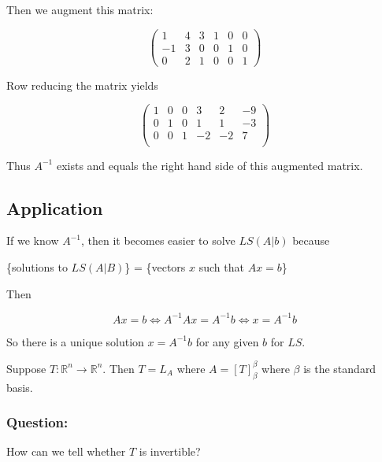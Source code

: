 \documentclass{article}
\newtheorem{one minute paper}[theorem]{One Minute Paper}
\begin{document}
Then we augment this matrix:

\begin{equation}
    \left(\begin{array}{ccc|ccc}
        1 & 4 & 3 & 1 & 0 & 0 \\
        -1 & 3 & 0 & 0 & 1 & 0 \\
        0 & 2 & 1 & 0 & 0 & 1
    \end{array}\right)
\end{equation}

Row reducing the matrix yields 

\begin{equation}
    \left(\begin{array}{ccc|ccc}
        1 & 0 & 0 & 3 & 2 & -9 \\
        0 & 1 & 0 & 1 & 1 & -3 \\
        0 & 0 & 1 & -2 & -2 & 7 \\
    \end{array}\right)
\end{equation}

Thus $A^{-1}$ exists and equals the right hand side of this augmented matrix. 

\subsection*{Application}

If we know $A^{-1}$, then it becomes easier to solve $LS(A|b)$ because
\begin{center}
    \{solutions to $LS(A|B)$\} = \{vectors $x$ such that $Ax = b$\}
\end{center}

Then 

\begin{equation}
    Ax = b \iff A^{-1}Ax = A^{-1}b \iff x = A^{-1}b
\end{equation}

So there is a unique solution $x = A^{-1}b$ for any given $b$ for $LS$. 

\newpage 

Suppose $T: \mathbb{R}^n \rightarrow \mathbb{R}^n$. Then $T = L_A$ where $A = [T]_\beta^\beta$ where $\beta$ is the standard basis.

\subsubsection*{Question:}

How can we tell whether $T$ is invertible? 
\end{document}
